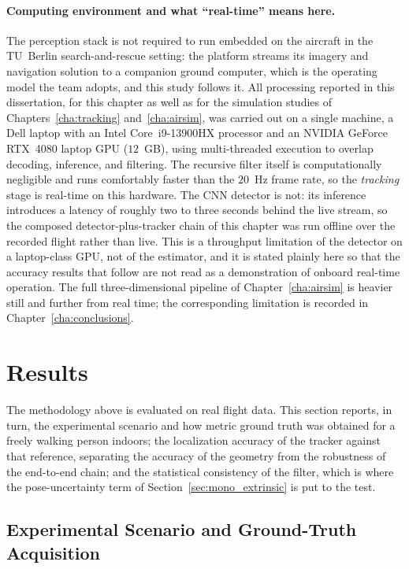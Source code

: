 \paragraph*{Computing environment and what ``real-time'' means here.} The
perception stack is not required to run embedded on the aircraft in the TU~Berlin
search-and-rescue setting: the platform streams its imagery and navigation
solution to a companion ground computer, which is the operating model the team
adopts, and this study follows it. All processing reported in this dissertation,
for this chapter as well as for the simulation studies of
Chapters~\ref{cha:tracking} and~\ref{cha:airsim}, was carried out on a single
machine, a Dell laptop with an Intel Core~i9-13900HX processor and an NVIDIA
GeForce RTX~4080 laptop GPU ($12$~GB), using multi-threaded execution to overlap decoding, inference, and
filtering. The recursive filter itself is computationally negligible and runs
comfortably faster than the $20$~Hz frame rate, so the \emph{tracking} stage is
real-time on this hardware. The CNN detector is not: its inference introduces a
latency of roughly two to three seconds behind the live stream, so the composed
detector-plus-tracker chain of this chapter was run offline over the recorded
flight rather than live. This is a throughput limitation of the detector on a
laptop-class GPU, not of the estimator, and it is stated plainly here so that the
accuracy results that follow are not read as a demonstration of onboard real-time
operation. The full three-dimensional pipeline of Chapter~\ref{cha:airsim} is
heavier still and further from real time; the corresponding limitation is recorded
in Chapter~\ref{cha:conclusions}.

\section{Results}
\label{sec:mono_results}

The methodology above is evaluated on real flight data. This section reports, in
turn, the experimental scenario and how metric ground truth was obtained for a
freely walking person indoors; the localization accuracy of the tracker against
that reference, separating the accuracy of the geometry from the robustness of the
end-to-end chain; and the statistical consistency of the filter, which is where
the pose-uncertainty term of Section~\ref{sec:mono_extrinsic} is put to the test.

\subsection{Experimental Scenario and Ground-Truth Acquisition}
\label{sec:mono_scenario}

